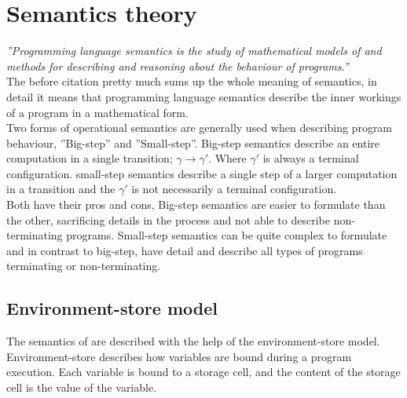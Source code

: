 \section{Semantics theory}\label{sec:semantic}
\emph{''Programming language semantics is the study of mathematical models of and methods for describing and reasoning about the behaviour of programs.''}\cite{transtrees}\\
The before citation pretty much sums up the whole meaning of semantics, in detail it means that programming language semantics describe the inner workings of a program in a mathematical form.\\
Two forms of operational semantics are generally used when describing program behaviour, ''Big-step'' and ''Small-step''.
Big-step semantics describe an entire computation in a single transition;
$ \gamma \rightarrow \gamma' $.
Where $\gamma'$ is always a terminal configuration.
small-step semantics describe a single step of a larger computation in a transition and the $ \gamma' $ is not necessarily a terminal configuration.\\
Both have their pros and cons, Big-step semantics are easier to formulate than the other, sacrificing details in the process and not able to describe non-terminating programs. Small-step semantics can be quite complex to formulate and in contrast to big-step, have detail and describe all types of programs terminating or non-terminating.\cite{opsemantics}\cite{transtrees}

\subsection{Environment-store model}\label{subsec:env-sto}
The semantics of \langname{} are described with the help of the environment-store model. Environment-store describes how variables are bound during a program execution. Each variable is bound to a storage cell, and the content of the storage cell is the value of the variable.

